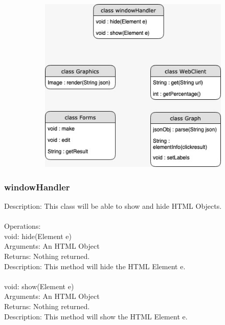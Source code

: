 \documentclass[12pt]{extarticle}
\begin{document}
\begin{figure}[H]
    \centering
    \begin{subfigure}[b]{0.85\textwidth}
        \includegraphics[width=\textwidth]{img3.jpeg}
        \label{fig:arc_1}
    \end{subfigure}
\end{figure}

\subsubsection{windowHandler}
Description: This class will be able to show and hide HTML Objects. \\ \\
Operations: \\
    void: hide(Element e) \\
    Arguments: An HTML Object \\
	Returns: Nothing returned. \\
	Description: This method will hide the HTML Element e. \\ \\
	void: show(Element e) \\
    Arguments: An HTML Object \\
	Returns: Nothing returned. \\
	Description: This method will show the HTML Element e. \\
\end{document}
